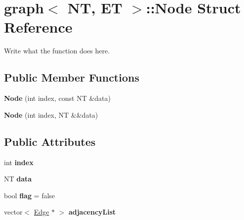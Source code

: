 \hypertarget{structgraph_1_1Node}{\section{graph$<$ N\+T, E\+T $>$\+:\+:Node Struct Reference}
\label{structgraph_1_1Node}
}


Write what the function does here.  


\subsection*{Public Member Functions}
\begin{DoxyCompactItemize}
\item 
\hypertarget{structgraph_1_1Node_a2ea59c8e60a21337707a4724ec2187c3}{{\bfseries Node} (int index, const N\+T \&data)}\label{structgraph_1_1Node_a2ea59c8e60a21337707a4724ec2187c3}

\item 
\hypertarget{structgraph_1_1Node_a00ae7db8b8befe0e81b08dc6da311ce4}{{\bfseries Node} (int index, N\+T \&\&data)}\label{structgraph_1_1Node_a00ae7db8b8befe0e81b08dc6da311ce4}

\end{DoxyCompactItemize}
\subsection*{Public Attributes}
\begin{DoxyCompactItemize}
\item 
\hypertarget{structgraph_1_1Node_ab4a666688dbafdca1b669513bc44f426}{int {\bfseries index}}\label{structgraph_1_1Node_ab4a666688dbafdca1b669513bc44f426}

\item 
\hypertarget{structgraph_1_1Node_adc94dabc0af744a6715917606e9cc0d5}{N\+T {\bfseries data}}\label{structgraph_1_1Node_adc94dabc0af744a6715917606e9cc0d5}

\item 
\hypertarget{structgraph_1_1Node_a4b9b756169b675dfae4084567abe6293}{bool {\bfseries flag} = false}\label{structgraph_1_1Node_a4b9b756169b675dfae4084567abe6293}

\item 
\hypertarget{structgraph_1_1Node_abfdd0522b2b424059fa50c10616353d1}{vector$<$ \hyperlink{structgraph_1_1Edge}{Edge} $\ast$ $>$ {\bfseries adjacency\+List}}\label{structgraph_1_1Node_abfdd0522b2b424059fa50c10616353d1}

\end{DoxyCompactItemize}



